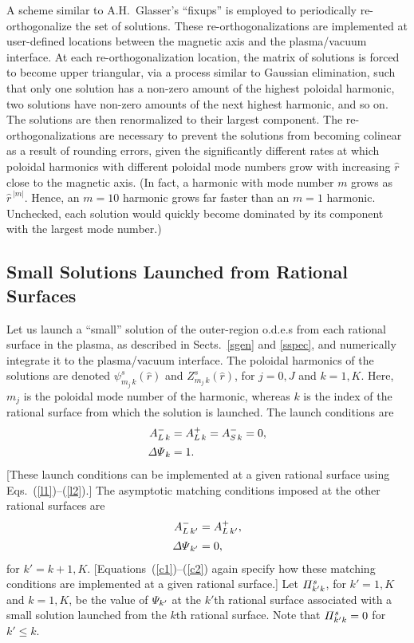\documentclass[12pt,prb,aps]{revtex4-1}
\begin{document}
A scheme similar to A.H.~Glasser's ``fixups'' \cite{ham} is employed to periodically re-orthogonalize the set of solutions. These  re-orthogonalizations are implemented at user-defined locations between the magnetic axis and the plasma/vacuum interface.  At each re-orthogonalization location, the matrix of solutions is forced to become upper triangular, via a process similar to Gaussian elimination, such that only one solution has a non-zero amount of the highest poloidal  harmonic, two solutions have non-zero amounts of the next highest harmonic, and so on. The solutions are then renormalized to their largest component. 
 The re-orthogonalizations are
 necessary to prevent the solutions from becoming colinear as a result of rounding errors, given the significantly
 different rates at which poloidal harmonics with different poloidal mode numbers grow with increasing $\hat{r}$  close to the magnetic axis. (In fact, a
 harmonic with mode number $m$ grows as $\hat{r}^{\,|m|}$. Hence, an $m=10$ harmonic  grows far faster than an $m=1$ harmonic. Unchecked, each solution
 would quickly become dominated by its component with the largest mode number.)

\subsection{Small Solutions Launched from Rational Surfaces}\label{smalll}
Let us launch a ``small'' solution of the outer-region o.d.e.s  from each rational surface in the plasma, as described in Sects.~\ref{sgen} and \ref{sspec}, 
 and numerically integrate it to the plasma/vacuum interface. The poloidal harmonics of
the solutions are denoted $\psi^s_{m_{j}\,k}(\hat{r})$ and $Z^s_{m_{j}\,k}(\hat{r})$, for $j=0,J$ and $k=1,K$. Here,
$m_{j}$ is the poloidal mode number of the harmonic, whereas $k$ is the index of the rational surface from which the solution is launched.
The launch conditions are
\begin{align}
A_{L\,k}^- &= A_{L\,k}^+ = A_{S\,k}^- = 0,\\[0.5ex]
{\mit\Delta\Psi}_k &=1.
\end{align}
[These launch conditions can be implemented at a given rational surface using Eqs.~(\ref{l1})--(\ref{l2}).]
The asymptotic matching conditions imposed at the other rational surfaces are
\begin{align}
A_{L\,k'}^{-} &= A_{L\,k'}^+,\\[0.5ex]
{\mit\Delta\Psi}_{k'} &= 0,
\end{align}
for $k'=k+1,K$. [Equations~(\ref{c1})--(\ref{c2}) again specify how these matching conditions are implemented at a given rational surface.]
Let 
${\mit\Pi}_{k'k}^s$, for $k'=1,K$ and $k=1,K$,  be the value of ${\mit\Psi}_{k'}$ at the $k'$th rational surface associated with a small solution
launched from the $k$th rational surface. Note that ${\mit\Pi}_{k'k}^s=0$ for $k' \leq k$.  
\end{document}
